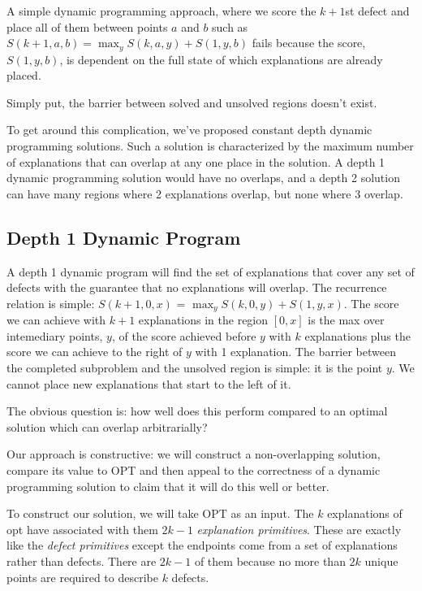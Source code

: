 \documentclass[11pt,twocolumn]{article}
\begin{document}
A simple dynamic programming approach, where we score the $k+1$st defect and place all of them between points $a$ and $b$ such as $S(k+1,a,b) = \max_y S(k,a,y) + S(1,y,b)$ fails because the score, $ S(1,y,b)$, is dependent on the full state of which explanations are already placed.

Simply put, the barrier between solved and unsolved regions doesn't exist.

To get around this complication, we've proposed constant depth dynamic programming solutions.  Such a solution is characterized by the maximum number of explanations that can overlap at any one place in the solution.  A depth 1 dynamic programming solution would have no overlaps, and a depth 2 solution can have many regions where 2 explanations overlap, but none where 3 overlap.

\subsection{Depth 1 Dynamic Program} \label{sec:1DP}

A depth 1 dynamic program will find the set of explanations that cover any set of defects with the guarantee that no explanations will overlap.  The recurrence relation is simple: $S(k+1,0,x)$ = $\max_y S(k,0,y) + S(1,y,x)$.  The score we can achieve with $k+1$ explanations in the region $[0,x]$ is the max over intemediary points, $y$, of the score achieved before $y$ with $k$ explanations plus the score we can achieve to the right of $y$ with 1 explanation. The barrier between the completed subproblem and the unsolved region is simple: it is the point $y$. We cannot place new explanations that start to the left of it.

The obvious question is: how well does this perform compared to an optimal solution which can overlap arbitrarially?

Our approach is constructive: we will construct a non-overlapping solution, compare its value to OPT and then appeal to the correctness of a dynamic programming solution to claim that it will do this well or better.

To construct our solution, we will take OPT as an input.  The $k$ explanations of opt have associated with them $2k-1$ {\it explanation primitives}.  These are exactly like the {\it defect primitives} except the endpoints come from a set of explanations rather than defects. There are $2k-1$ of them because no more than $2k$ unique points are required to describe $k$ defects.
\end{document}
